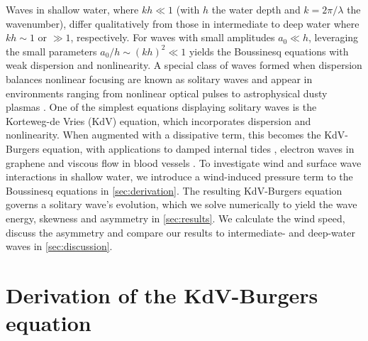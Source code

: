 \documentclass{jfm}
\begin{document}
Waves in shallow water, where $kh \ll 1$ (with $h$ the water depth and
$k=2\pi/\lambda$ the wavenumber), differ qualitatively from those in
intermediate to deep water where $kh \sim 1$ or $\gg 1$, respectively.
For waves with small amplitudes $a_0 \ll h$,
leveraging the small parameters $a_0/h \sim (kh)^2 \ll 1$
yields the Boussinesq equations with weak dispersion and nonlinearity.
A special class of waves formed when dispersion balances nonlinear
focusing are known as solitary waves and appear in environments ranging
from nonlinear optical pulses \citep[\eg][]{kivshar1993dark} to
astrophysical dusty plasmas \citep[\eg][]{sahu2012nonextensive}.
One of the simplest equations displaying solitary waves is the
Korteweg-de Vries (KdV) equation, which incorporates dispersion and
nonlinearity.
When augmented with a dissipative term, this becomes the KdV-Burgers
equation, with applications to damped internal tides
\citep[\eg][]{sandstrom1995dissipation}, electron waves in graphene
\citep[\eg][]{zdyrski2019effects} and viscous flow in blood vessels
\citep[\eg][]{antar1999weakly}.
To investigate wind and surface wave interactions in shallow water, we
introduce a wind-induced pressure term to the Boussinesq equations in
\cref{sec:derivation}.
The resulting KdV-Burgers equation governs a solitary wave's evolution,
which we solve numerically to yield the wave energy, skewness and
asymmetry in \cref{sec:results}.
We calculate the wind speed, discuss the asymmetry and
compare our results to intermediate- and deep-water waves in
\cref{sec:discussion}.

\section{\label{sec:derivation} Derivation of the KdV-Burgers equation}
\end{document}
